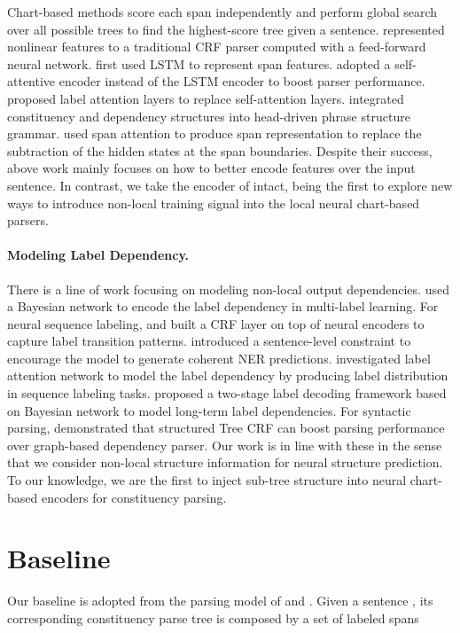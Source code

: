 \documentclass[11pt]{article}
\begin{document}
Chart-based methods score each span independently and perform global search over all possible trees to find the highest-score tree given a sentence. 
\citet{crf-parsing} represented nonlinear features to a traditional CRF parser computed with a feed-forward neural network. 
\citet{stern-etal-2017-minimal} first used LSTM to represent span features. 
\citet{san-constituency} adopted a self-attentive encoder instead of the LSTM encoder to boost parser performance.
\citet{label-attention-parsing} proposed label attention layers to replace self-attention layers.
\citet{head-driven} integrated constituency and dependency structures into head-driven phrase structure grammar.
\citet{span-attention} used span attention to produce span representation to replace the subtraction of the hidden states at the span boundaries.
Despite their success, above work mainly focuses on how to better encode features over the input sentence. In contrast, we take the encoder of \citet{san-constituency} intact, being the first to explore new ways to introduce non-local training signal into the local neural chart-based parsers.


\paragraph{Modeling Label Dependency.}
There is a line of work focusing on modeling non-local output dependencies. 
\citet{mll} used a Bayesian network to encode the label dependency in multi-label learning.
For neural sequence labeling, \citet{zhou-xu-2015-end} and \citet{lstm-crf} built a CRF layer on top of neural encoders to capture label transition patterns.
\citet{forest-ner} introduced a sentence-level constraint to encourage the model to generate coherent NER predictions. \citet{lan} investigated label attention network to model the label dependency by producing label distribution in sequence labeling tasks. \citet{gui-etal-2020-uncertainty} proposed a two-stage label decoding framework based on Bayesian network to model long-term label dependencies. For syntactic parsing, \citet{constituency-crf} demonstrated that structured Tree CRF can boost parsing performance over graph-based dependency parser. 
Our work is in line with these in the sense that we consider non-local structure information for neural structure prediction.
To our knowledge, we are the first to inject sub-tree structure into neural chart-based encoders for constituency parsing.


\section{Baseline}
\label{sec:baseline}
Our baseline is adopted from the parsing model of \citet{san-constituency} and \citet{kitaev-etal-2019-multi-lingual}. 
Given a sentence , its corresponding constituency parse tree  is composed by a set of labeled spans 
\end{document}
